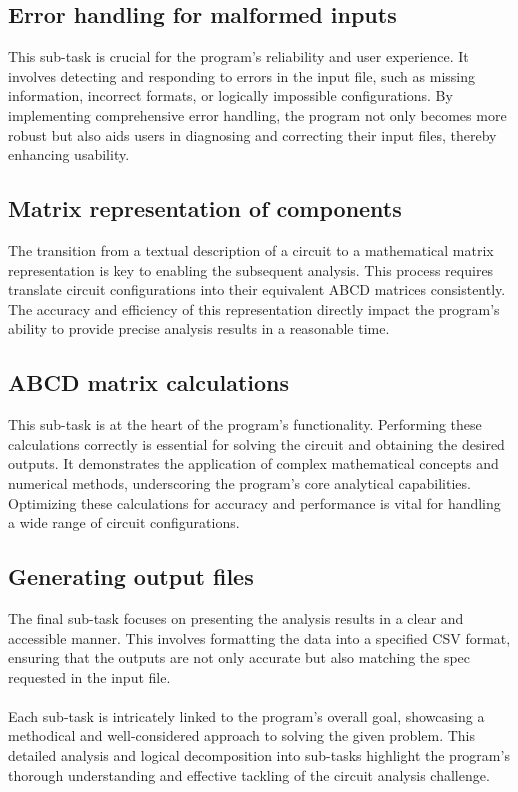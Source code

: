 \documentclass[conference]{IEEEtran}
\begin{document}
\subsection{\textbf{Error handling for malformed inputs}}
This sub-task is crucial for the program's reliability and user experience. It involves detecting and responding to errors in the input file, such as missing information, incorrect formats, or logically impossible configurations. By implementing comprehensive error handling, the program not only becomes more robust but also aids users in diagnosing and correcting their input files, thereby enhancing usability.

\subsection{\textbf{Matrix representation of components}}
The transition from a textual description of a circuit to a mathematical matrix representation is key to enabling the subsequent analysis. This process requires translate circuit configurations into their equivalent ABCD matrices consistently. The accuracy and efficiency of this representation directly impact the program's ability to provide precise analysis results in a reasonable time.

\subsection{\textbf{ABCD matrix calculations}}
This sub-task is at the heart of the program's functionality. Performing these calculations correctly is essential for solving the circuit and obtaining the desired outputs. It demonstrates the application of complex mathematical concepts and numerical methods, underscoring the program's core analytical capabilities. Optimizing these calculations for accuracy and performance is vital for handling a wide range of circuit configurations.

\subsection{\textbf{Generating output files}}
The final sub-task focuses on presenting the analysis results in a clear and accessible manner. This involves formatting the data into a specified CSV format, ensuring that the outputs are not only accurate but also matching the spec requested in the input file.
\\\\
Each sub-task is intricately linked to the program's overall goal, showcasing a methodical and well-considered approach to solving the given problem. This detailed analysis and logical decomposition into sub-tasks highlight the program's thorough understanding and effective tackling of the circuit analysis challenge.
\end{document}
